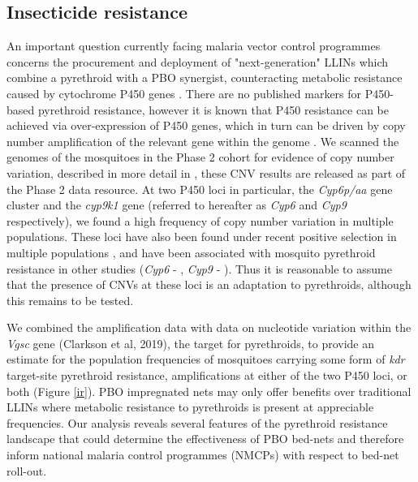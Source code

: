 \documentclass[a4paper,11pt,abstracton,hidelinks]{scrartcl}
\begin{document}
\subsection*{Insecticide resistance}

%
An important question currently facing malaria vector control programmes concerns the procurement and deployment of "next-generation" LLINs which combine a pyrethroid with a PBO synergist, counteracting metabolic resistance caused by cytochrome P450 genes \cite{churcher2016, killeen2018, toe2018}.
%
There are no published markers for P450-based pyrethroid resistance, however it is known that P450 resistance can be achieved via over-expression of P450 genes, which in turn can be driven by copy number amplification of the relevant gene within the genome \cite{riveron2014, muller2008}.
%
We scanned the genomes of the mosquitoes in the Phase 2 cohort for evidence of copy number variation, described in more detail in \cite{lucas2019}, these CNV results are released as part of the Phase 2 data resource.
%
At two P450 loci in particular, the \textit{Cyp6p/aa} gene cluster and the \textit{cyp9k1} gene (referred to hereafter as \textit{Cyp6} and \textit{Cyp9} respectively), we found a high frequency of copy number variation in multiple populations.
%
These loci have also been found under recent positive selection in multiple populations \cite{Ag1000gConsortium2017}, and have been associated with mosquito pyrethroid resistance in other studies (\textit{Cyp6} - \cite{nikou2003, edi2014, faucon2015, main2018}, \textit{Cyp9} - \cite{main2018, tchigossou2018, vontas2018}).
%
Thus it is reasonable to assume that the presence of CNVs at these loci is an adaptation to pyrethroids, although this remains to be tested.


We combined the amplification data with data on nucleotide variation within the \textit{Vgsc} gene (Clarkson et al, 2019), the target for pyrethroids, to provide an estimate for the population frequencies of mosquitoes carrying some form of \textit{kdr} target-site pyrethroid resistance, amplifications at either of the two P450 loci, or both (Figure \ref{ir}). 
%
PBO impregnated nets may only offer benefits over traditional LLINs where metabolic resistance to pyrethroids is present at appreciable frequencies.
%
Our analysis reveals several features of the pyrethroid resistance landscape that could determine the effectiveness of PBO bed-nets and therefore inform national malaria control programmes (NMCPs) with respect to bed-net roll-out.
\end{document}
